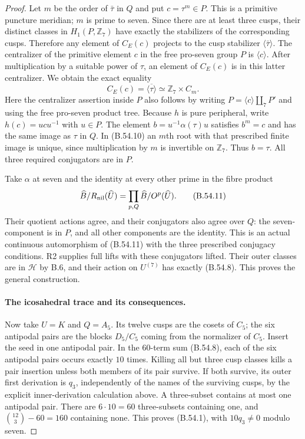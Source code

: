 \begin{proof}
Let $m$ be the order of $\bar\tau$ in $Q$ and put
$c=\tau^m\in P$. This is a primitive puncture meridian;
$m$ is prime to seven. Since there are at least three
cusps, their distinct classes in $H_1(P,\mathbb Z_7)$
have exactly the stabilizers of the corresponding
cusps. Therefore any element of $C_E(c)$ projects to
the cusp stabilizer $\langle\bar\tau\rangle$.
The centralizer of the primitive element $c$ in the
free pro-seven group $P$ is $\langle c\rangle$.
After multiplication by a suitable power of $\tau$,
an element of $C_E(c)$ is in this latter centralizer.
We obtain the exact equality
\[
                C_E(c)=\overline{\langle\tau\rangle}
                               \simeq\mathbb Z_7\times C_m.
                                                               \tag{B.54.10}
\]
Here the centralizer assertion inside $P$ also follows
by writing $P=\langle c\rangle\amalg_7 P'$ and using
the free pro-seven product tree.
Because $h$ is pure peripheral, write $h(c)=ucu^{-1}$
with $u\in P$. The element
$b=u^{-1}\alpha(\tau)u$ satisfies $b^m=c$ and has
the same image as $\tau$ in $Q$. In (B.54.10) an
$m$th root with that prescribed finite image is unique,
since multiplication by $m$ is invertible on
$\mathbb Z_7$. Thus $b=\tau$.
All three required conjugators are in $P$.

Take $\alpha$ at seven and the identity at every other
prime in the fibre product
\[
 \widehat B/R_{\rm nil}(\widehat U)
       =\prod_{p,Q}\widehat B/O^p(\widehat U).
                                                               \tag{B.54.11}
\]
Their quotient actions agree, and their conjugators
also agree over $Q$: the seven-component is in $P$,
and all other components are the identity. This is
an actual continuous automorphism of (B.54.11) with
the three prescribed conjugacy conditions. R2 supplies
full lifts with these conjugators lifted. Their outer
classes are in $\mathcal H$ by B.6, and their action
on $U^{(7)}$ has exactly (B.54.8). This proves the
general construction.

\paragraph{The icosahedral trace and its consequences.}
Now take $U=K$ and $Q=A_5$. Its twelve cusps are the
cosets of $C_5$; the six antipodal pairs are the
blocks $D_5/C_5$ coming from the normalizer of $C_5$.
Insert the seed in one antipodal pair. In the
$60$-term sum (B.54.8), each of the six antipodal
pairs occurs exactly $10$ times.
Killing all but three cusp classes kills a pair
insertion unless both members of its pair survive.
If both survive, its outer first derivation is $q_3$,
independently of the names of the surviving cusps,
by the explicit inner-derivation calculation above.
A three-subset contains at most one antipodal pair.
There are $6\cdot10=60$ three-subsets containing
one, and $\binom{12}{3}-60=160$ containing none.
This proves (B.54.1), with $10q_3\ne0$ modulo seven.


\end{proof}
